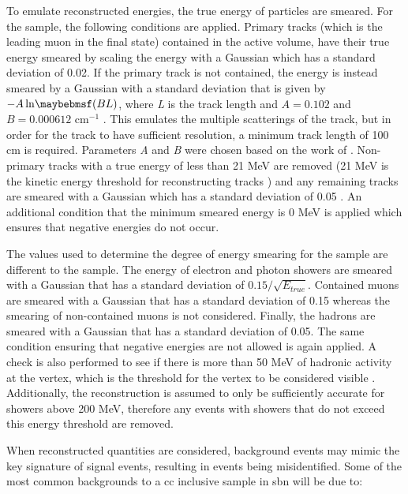 To emulate reconstructed energies, the true energy of particles are smeared. For the \numu sample, the following conditions are applied. Primary tracks (which is the leading muon in the final state) contained in the active volume, have their true energy smeared by scaling the energy with a Gaussian which has a standard deviation of 0.02. If the primary track is not contained, the energy is instead smeared by a Gaussian with a standard deviation that is given by $-A\lnOfbraces{BL}$,
where \textit{L} is the track length and $A = 0.102$ and $B = 0.000612$ cm$^{-1}$ \cite{SBN_Proposal}. This emulates the multiple scatterings of the track, but in order for the track to have sufficient resolution, a minimum track length of 100 cm is required. Parameters \textit{A} and \textit{B} were chosen based on the work of \cite{ICARUS_muon_smearing}. Non-primary tracks with a true energy of less than 21 MeV are removed (21 MeV is the kinetic energy threshold for reconstructing tracks \cite{SBN_Proposal}) and any remaining tracks are smeared with a Gaussian which has a standard deviation of 0.05 \cite{SBN_Proposal}. An additional condition that the minimum smeared energy is 0 MeV is applied which ensures that negative energies do not occur.

The values used to determine the degree of energy smearing for the \nue sample are different to the \numu sample. The energy of electron and photon showers are smeared with a Gaussian that has a standard deviation of $0.15/\sqrt{E_{true}}$. Contained muons are smeared with a Gaussian that has a standard deviation of 0.15 whereas the smearing of non-contained muons is not considered. Finally, the hadrons are smeared with a Gaussian that has a standard deviation of 0.05. The same condition ensuring that negative energies are not allowed is again applied. A check is also performed to see if there is more than 50 MeV of hadronic activity at the vertex, which is the threshold for the vertex to be considered visible \cite{SBN_Proposal}. Additionally, the reconstruction is assumed to only be sufficiently accurate for showers above 200 MeV, therefore any events with showers that do not exceed this energy threshold are removed. 

When reconstructed quantities are considered, background events may mimic the key signature of signal events, resulting in events being misidentified. Some of the most common backgrounds to a \gls{cc} inclusive sample in \gls{sbn} will be due to: 

